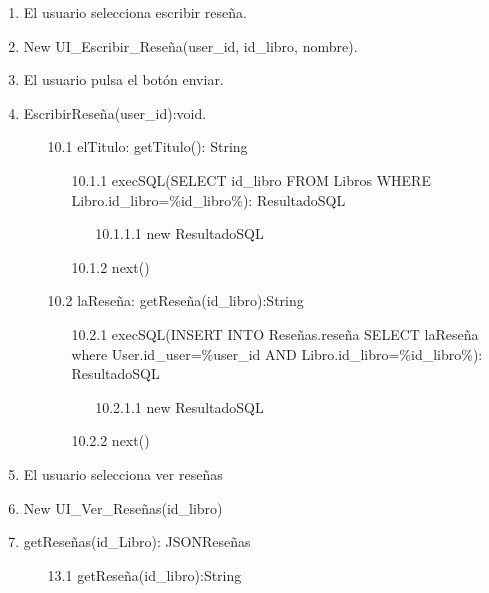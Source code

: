 ﻿\documentclass{report}
\begin{document}
\begin{enumerate}
\begin{enumerate}
            \end{enumerate}
            \item El usuario selecciona escribir reseña.
            \item New UI\_Escribir\_Reseña(user\_id, id\_libro, nombre).
            \item El usuario pulsa el botón enviar.
            \item EscribirReseña(user\_id):void.
            \begin{enumerate}
                \item [10.1] elTitulo: getTitulo(): String
                \begin{enumerate}
                   \item [10.1.1] execSQL(SELECT id\_libro FROM Libros WHERE Libro.id\_libro=\%id\_libro\%): ResultadoSQL
                   \begin{enumerate}
                        \item [10.1.1.1] new ResultadoSQL
                    \end{enumerate}               
                    \item [10.1.2] next()                       
                \end{enumerate}
                \item [10.2] laReseña: getReseña(id\_libro):String
                \begin{enumerate}
                   \item [10.2.1] execSQL(INSERT INTO Reseñas.reseña SELECT laReseña where User.id\_user=\%user\_id AND  Libro.id\_libro=\%id\_libro\%): ResultadoSQL
                   \begin{enumerate}
                        \item [10.2.1.1] new ResultadoSQL
                    \end{enumerate}               
                    \item [10.2.2] next()                       
                \end{enumerate}
            \end{enumerate}
            \item El usuario selecciona ver reseñas
            \item New UI\_Ver\_Reseñas(id\_libro)
            \item getReseñas(id\_Libro): JSONReseñas
            \begin{enumerate}
                \item [13.1] getReseña(id\_libro):String

\end{enumerate}
\end{enumerate}
\end{document}
